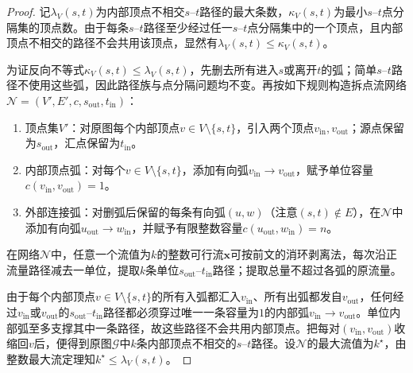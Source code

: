 \begin{proof}
记$\lambda_V(s,t)$为内部顶点不相交$s$--$t$路径的最大条数，$\kappa_V(s,t)$为最小$s$--$t$点分隔集的顶点数。由于每条$s$--$t$路径至少经过任一$s$--$t$点分隔集中的一个顶点，且内部顶点不相交的路径不会共用该顶点，显然有$\lambda_V(s,t)\leq\kappa_V(s,t)$。

为证反向不等式$\kappa_V(s,t)\leq\lambda_V(s,t)$，先删去所有进入$s$或离开$t$的弧；简单$s$--$t$路径不使用这些弧，因此路径族与点分隔问题均不变。再按如下规则构造拆点流网络$\mathcal N=(V',E',c,s_{\mathrm{out}},t_{\mathrm{in}})$：
\begin{enumerate}
  \item 顶点集$V'$：对原图每个内部顶点$v\in V\setminus\{s,t\}$，引入两个顶点$v_{\mathrm{in}},v_{\mathrm{out}}$；源点保留为$s_{\mathrm{out}}$，汇点保留为$t_{\mathrm{in}}$。
  \item 内部顶点弧：对每个$v\in V\setminus\{s,t\}$，添加有向弧$v_{\mathrm{in}}\to v_{\mathrm{out}}$，赋予单位容量$c(v_{\mathrm{in}},v_{\mathrm{out}})=1$。
  \item 外部连接弧：对删弧后保留的每条有向弧$(u,w)$（注意$(s,t)\notin E$），在$\mathcal N$中添加有向弧$u_{\mathrm{out}}\to w_{\mathrm{in}}$，并赋予有限整数容量$c(u_{\mathrm{out}},w_{\mathrm{in}})=n$。
\end{enumerate}

在网络$\mathcal N$中，任意一个流值为$k$的整数可行流$\bm x$可按前文的消环剥离法，每次沿正流量路径减去一单位，提取$k$条单位$s_{\mathrm{out}}$--$t_{\mathrm{in}}$路径；提取总量不超过各弧的原流量。

由于每个内部顶点$v\in V\setminus\{s,t\}$的所有入弧都汇入$v_{\mathrm{in}}$、所有出弧都发自$v_{\mathrm{out}}$，任何经过$v_{\mathrm{in}}$或$v_{\mathrm{out}}$的$s_{\mathrm{out}}$--$t_{\mathrm{in}}$路径都必须穿过唯一一条容量为$1$的内部弧$v_{\mathrm{in}}\to v_{\mathrm{out}}$。单位内部弧至多支撑其中一条路径，故这些路径不会共用内部顶点。把每对$(v_{\mathrm{in}},v_{\mathrm{out}})$收缩回$v$后，便得到原图$\mathcal G$中$k$条内部顶点不相交的$s$--$t$路径。设$\mathcal N$的最大流值为$k^\star$，由整数最大流定理知$k^\star\leq\lambda_V(s,t)$。


\end{proof}
